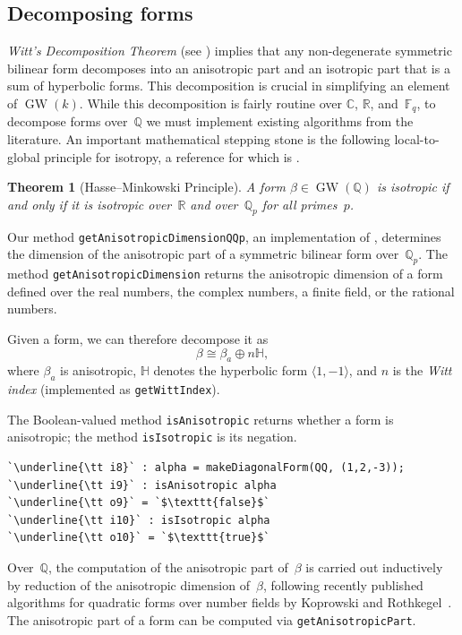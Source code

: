 \documentclass[12pt]{amsart}
\newtheorem{theorem}{Theorem}
\theoremstyle{definition}
\DeclareMathOperator{\GW}{GW}
\begin{document}
\subsection{Decomposing forms}\label{subsec: decomposing forms}
\emph{Witt's Decomposition Theorem} (see \cite[I.4.1]{Lam}) implies that any non-degenerate symmetric bilinear form decomposes into an anisotropic part and an isotropic part that is a sum of hyperbolic forms. This decomposition is crucial in simplifying an element of $\GW(k)$. While this decomposition is fairly routine over $\mathbb{C}$, $\mathbb{R}$, and~$\mathbb{F}_q$, to decompose forms over~$\mathbb{Q}$ we must implement existing algorithms from the literature. An important mathematical stepping stone is the following local-to-global principle for isotropy, a reference for which is \cite[VI.3.1]{Lam}.

\begin{theorem}[Hasse--Minkowski Principle]\label{thm:lgp-isotropy}
A form $\beta\in \GW(\mathbb{Q})$ is isotropic if and only if it is isotropic over~$\mathbb{R}$ and over~$\mathbb{Q}_p$ for all primes~$p$.
\end{theorem}

Our method \texttt{getAnisotropicDimensionQQp}, an implementation of \cite[Algorithm~8]{KC}, determines the dimension of the anisotropic part of a symmetric bilinear form over~$\mathbb{Q}_p$. The method \texttt{getAnisotropicDimension} returns the anisotropic dimension of a form defined over the real numbers, the complex numbers, a finite field, or the rational numbers.

Given a form, we can therefore decompose it as
\[
\beta \cong \beta_a \oplus n \mathbb{H},
\]
where $\beta_a$ is anisotropic, $\mathbb{H}$ denotes the hyperbolic form $\langle 1,-1 \rangle$, and $n$ is the \emph{Witt index} (implemented as \texttt{getWittIndex}).

The Boolean-valued method \texttt{isAnisotropic} returns whether a form is anisotropic; the method \texttt{isIsotropic} is its negation.

\begin{lstlisting}[language=Macaulay2output]
`\underline{\tt i8}` : alpha = makeDiagonalForm(QQ, (1,2,-3));
`\underline{\tt i9}` : isAnisotropic alpha
`\underline{\tt o9}` = `$\texttt{false}$`
`\underline{\tt i10}` : isIsotropic alpha
`\underline{\tt o10}` = `$\texttt{true}$`
\end{lstlisting}

Over~$\mathbb{Q}$, the computation of the anisotropic part of~$\beta$ is carried out inductively by reduction of the anisotropic dimension of~$\beta$, following recently published algorithms for quadratic forms over number fields by Koprowski and Rothkegel~\cite{KR}. The anisotropic part of a form can be computed via \texttt{getAnisotropicPart}.
\end{document}
